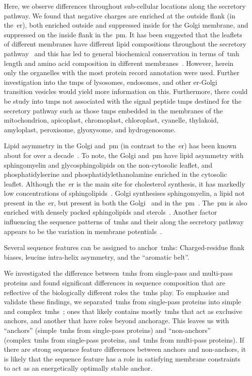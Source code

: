 Here, we observe differences throughout sub-cellular locations along the secretory pathway.
We found that negative charges are enriched at the outside flank (in the~\gls{er}), both enriched outside and suppressed inside for the Golgi membrane, and suppressed on the inside flank in the~\gls{pm}.
It has been suggested that the leaflets of different membranes have different lipid compositions throughout the secretory pathway~\cite{VanMeer2008} and this has led to general biochemical conservation in terms of~\gls{tmh} length and amino acid composition in different membranes~\cite{Sharpe2010, Pogozheva2013}.
However, herein only the organelles with the most protein record annotation were used.
Further investigation into the \gls{tmp}s of lysosomes, endosomes, and other \gls{er}\--Golgi transition vesicles would yield more information on this.
Furthermore, there could be study into \gls{tmp}s not associated with the signal peptide \gls{tmp}s destined for the secretory pathway such as those \gls{tmp}s embedded in the membranes of the mitochondrion, apicoplast, chromoplast, chloroplast, cyanelle, thylakoid, amyloplast, peroxisome, glyoxysome, and hydrogenosome.

Lipid asymmetry in the Golgi and~\gls{pm} (in contrast to the~\gls{er}) has been known about for over a decade~\cite{Daleke2007, Devaux2004}.
To note, the Golgi and~\gls{pm} have lipid asymmetry with sphingomyelin and glycosphingolipids on the non-cytosolic leaflet, and phosphatidylserine and phosphatidylethanolamine enriched in the cytosolic leaflet.
Although the~\gls{er} is the main site for cholesterol synthesis, it has markedly low concentrations of sphingolipids~\cite{Bell1981}.
Golgi synthesises sphingomyelin, a lipid not present in the~\gls{er}, but present in both the Golgi~\cite{Futerman2005} and in the~\gls{pm}~\cite{Li2007, Tafesse2007}.
The~\gls{pm} is also enriched with densely packed sphingolipids and sterols~\cite{Paolo2006}.
Another factor influencing the sequence patterns of~\gls{tmh}s and their along the secretory pathway appears to be the variation in membrane potentials~\cite{Qin2011, Worley1994, Schapiro2000}.

Several sequence features can be assigned to anchor~\gls{tmh}s: Charged-residue flank biases, leucine intra-helix asymmetry, and the ``aromatic belt''.

We investigated the difference between~\gls{tmh}s from single\--pass and multi\--pass proteins and found significant differences in sequence composition that are reflective of the biologically different roles the~\gls{tmh}s play.
To emphasise and validate these findings, we separated~\gls{tmh}s from single\--pass proteins into simple and complex~\gls{tmh}s~\cite{Wong2011, Wong2012}; ones that likely contains mostly~\gls{tmh}s that act as exclusive anchors, and another that have roles beyond anchorage.
This leaves us with ``anchors'' (simple~\gls{tmh}s from single\--pass proteins) and ``non-anchors'' (complex~\gls{tmh}s from single\--pass proteins, and~\gls{tmh}s from multi\--pass proteins).
If there are strong sequence feature differences between anchors and non-anchors, it is likely that the sequence feature has a role in satisfying membrane constraints to act as an energetically optimally stable anchor.

